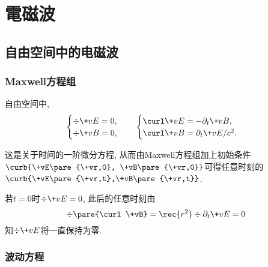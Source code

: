 \documentclass[hidelinks]{ctexart}
\begin{document}
\section{電磁波} %
\label{sec:电磁波}

\subsection{自由空间中的电磁波} %
\label{sub:自由空间中的电磁波}

\subsubsection{Maxwell方程组} %
\label{ssub:maxwell方程组}

自由空间中,
\[ \begin{cases}
    \div \+vE = 0, \\
    \div \+vB = 0,
\end{cases}\quad \begin{cases}
    \curl \+vE = -\partial_t \+vB, \\
    \curl \+vB = \partial_t \+vE/c^2.
\end{cases} \]
\begin{cenum}
    \item 这是关于时间的一阶微分方程, 从而由Maxwell方程组加上初始条件$\curb{\+vE\pare{\+vr,0}, \+vB\pare{\+vr,0}}$可得任意时刻的$\curb{\+vE\pare{\+vr,t},\+vB\pare{\+vr,t}}$.
    \item 若$t=0$时$\div \+vE = 0$, 此后的任意时刻由
    \[ \div \pare{\curl \+vB} = \rec{r^2} \div \partial_t \+vE = 0 \]
    知$\div \+vE$将一直保持为零.
\end{cenum}


\subsubsection{波动方程} %
\label{ssub:波动方程}
\end{document}
